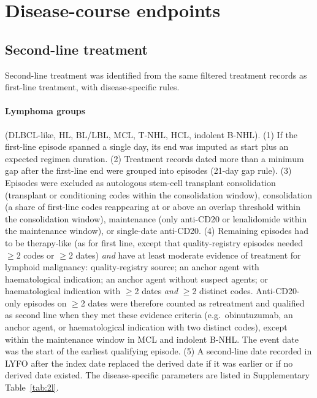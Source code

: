 \documentclass[10pt]{article}
\begin{document}
\section{Disease-course endpoints}\label{sec:2l}

\subsection{Second-line treatment}
Second-line treatment was identified from the same filtered treatment records
as first-line treatment, with disease-specific rules.

\paragraph{Lymphoma groups} (DLBCL-like, HL, BL/LBL, MCL, T-NHL, HCL, indolent
B-NHL). (1) If the first-line episode spanned a single day, its end was
imputed as start plus an expected regimen duration. (2) Treatment records dated
more than a minimum gap after the first-line end were grouped into episodes
(21-day gap rule). (3) Episodes were excluded as autologous stem-cell
transplant consolidation (transplant or conditioning codes within the
consolidation window), consolidation (a share of first-line codes reappearing
at or above an overlap threshold within the consolidation window), maintenance
(only anti-CD20 or lenalidomide within the maintenance window), or single-date
anti-CD20. (4) Remaining episodes had to be therapy-like (as for first line,
except that quality-registry episodes needed $\ge$2 codes or $\ge$2 dates)
\emph{and} have at least moderate evidence of treatment for lymphoid
malignancy: quality-registry source; an anchor agent with haematological
indication; an anchor agent without suspect agents; or haematological
indication with $\ge$2 dates \emph{and} $\ge$2 distinct codes. Anti-CD20-only
episodes on $\ge$2 dates were therefore counted as retreatment and qualified
as second line when they met these evidence criteria (e.g.\ obinutuzumab, an
anchor agent, or haematological indication with two distinct codes), except
within the maintenance window in MCL and indolent B-NHL. The event date was
the start of the earliest qualifying episode. (5) A second-line date recorded
in LYFO after the index date replaced the derived date if it was earlier or if
no derived date existed. The disease-specific parameters are listed in
Supplementary Table~\ref{tab:2l}.
\end{document}
